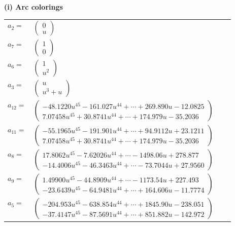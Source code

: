 \documentclass[1p]{elsarticle_modified}
\theoremstyle{definition}
\begin{document}
\flushleft \textbf{(i) Arc colorings}\\
\begin{tabular}{m{7pt} m{180pt} m{7pt} m{180pt} }
\flushright $a_{2}=$&$\begin{pmatrix}0\\u\end{pmatrix}$ \\
\flushright $a_{7}=$&$\begin{pmatrix}1\\0\end{pmatrix}$ \\
\flushright $a_{6}=$&$\begin{pmatrix}1\\u^2\end{pmatrix}$ \\
\flushright $a_{3}=$&$\begin{pmatrix}u\\u^3+u\end{pmatrix}$ \\
\flushright $a_{12}=$&$\begin{pmatrix}-48.1220 u^{45}-161.027 u^{44}+\cdots+269.890 u-12.0825\\7.07458 u^{45}+30.8741 u^{44}+\cdots+174.979 u-35.2036\end{pmatrix}$ \\
\flushright $a_{11}=$&$\begin{pmatrix}-55.1965 u^{45}-191.901 u^{44}+\cdots+94.9112 u+23.1211\\7.07458 u^{45}+30.8741 u^{44}+\cdots+174.979 u-35.2036\end{pmatrix}$ \\
\flushright $a_{8}=$&$\begin{pmatrix}17.8062 u^{45}-7.62026 u^{44}+\cdots-1498.06 u+278.877\\-14.4006 u^{45}-46.3463 u^{44}+\cdots-73.7044 u+27.9560\end{pmatrix}$ \\
\flushright $a_{9}=$&$\begin{pmatrix}1.49900 u^{45}-44.8909 u^{44}+\cdots-1173.54 u+227.493\\-23.6439 u^{45}-64.9481 u^{44}+\cdots+164.606 u-11.7774\end{pmatrix}$ \\
\flushright $a_{5}=$&$\begin{pmatrix}-204.953 u^{45}-638.854 u^{44}+\cdots+1845.90 u-238.051\\-37.4147 u^{45}-87.5691 u^{44}+\cdots+851.882 u-142.972\end{pmatrix}$ \\

\end{tabular}
\end{document}
